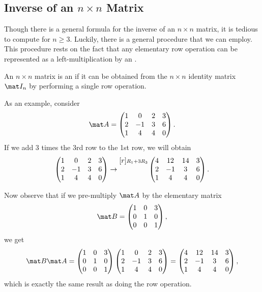 \subsection{Inverse of an \texorpdfstring{$n \times n$}{n x n} Matrix}

Though there is a general formula for the inverse of an $n \times n$ matrix, it is tedious to compute for $n \geq 3$. Luckily, there is a general procedure that we can employ. This procedure rests on the fact that any elementary row operation can be represented as a left-multiplication by an .

\begin{definition}
    An $n \times n$ matrix is an  if it can be obtained from the $n \times n$ identity matrix $\mat I_n$ by performing a single row operation.
\end{definition}

\begin{example}
    As an example, consider \[\mat A = \begin{pmatrix}1 & 0 & 2 & 3 \\ 2 & -1 & 3 & 6 \\ 1 & 4 & 4 & 0\end{pmatrix}.\] If we add 3 times the 3rd row to the 1st row, we will obtain \[\begin{pmatrix}1 & 0 & 2 & 3 \\ 2 & -1 & 3 & 6 \\ 1 & 4 & 4 & 0\end{pmatrix} \rightarrow \begin{matrix}[r]\scriptstyle R_1 + 3R_3 \\ \scriptstyle \\ \scriptstyle\end{matrix} \begin{pmatrix}4 & 12 & 14 & 3 \\ 2 & -1 & 3 & 6 \\ 1 & 4 & 4 & 0\end{pmatrix}.\]

    Now observe that if we pre-multiply $\mat A$ by the elementary matrix \[\mat B = \begin{pmatrix}1 & 0 & 3 \\ 0 & 1 & 0 \\ 0 & 0 & 1\end{pmatrix},\] we get \[\mat B \mat A = \begin{pmatrix}1 & 0 & 3 \\ 0 & 1 & 0 \\ 0 & 0 & 1\end{pmatrix} \begin{pmatrix}1 & 0 & 2 & 3 \\ 2 & -1 & 3 & 6 \\ 1 & 4 & 4 & 0\end{pmatrix} = \begin{pmatrix}4 & 12 & 14 & 3 \\ 2 & -1 & 3 & 6 \\ 1 & 4 & 4 & 0\end{pmatrix},\] which is exactly the same result as doing the row operation.
\end{example}

